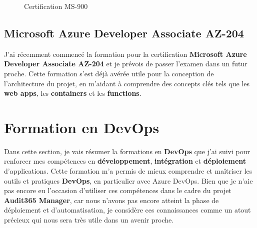 \begin{figure}[H]
    \begin{center}
        \caption{Certification MS-900}
    \end{center}
\end{figure}

\subsection{Microsoft Azure Developer Associate AZ-204}
J'ai récemment commencé la formation pour la certification \textbf{Microsoft Azure Developer Associate AZ-204} et je prévois de passer l'examen dans un futur proche. Cette formation s'est déjà avérée utile pour la conception de l'architecture du projet, en m'aidant à comprendre des concepts clés tels que les \textbf{web apps}, les \textbf{containers} et les \textbf{functions}.

\section{Formation en DevOps}
Dans cette section, je vais résumer la formations en \textbf{DevOps} que j'ai suivi pour renforcer mes compétences en \textbf{développement}, \textbf{intégration} et \textbf{déploiement} d'applications. Cette formation m'a permis de mieux comprendre et maîtriser les outils et pratiques \textbf{DevOps}, en particulier avec Azure DevOps. Bien que je n'aie pas encore eu l'occasion d'utiliser ces compétences dans le cadre du projet \textbf{Audit365 Manager}, car nous n'avons pas encore atteint la phase de déploiement et d'automatisation, je considère ces connaissances comme un atout précieux qui nous sera très utile dans un avenir proche.


